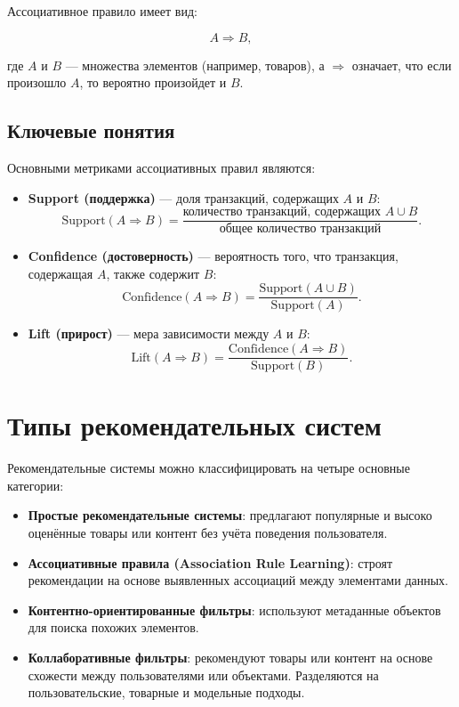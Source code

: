Ассоциативное правило имеет вид:

\begin{equation}
    A \Rightarrow B,
\end{equation}

где $A$ и $B$ — множества элементов (например, товаров), а $\Rightarrow$ означает, что если произошло $A$, то вероятно произойдет и $B$.

\subsection{Ключевые понятия}

Основными метриками ассоциативных правил являются:

\begin{itemize}
    \item \textbf{Support (поддержка)} — доля транзакций, содержащих $A$ и $B$:
          \[\text{Support}(A \Rightarrow B) = \frac{\text{количество транзакций, содержащих } A \cup B}{\text{общее количество транзакций}}.\]
    \item \textbf{Confidence (достоверность)} — вероятность того, что транзакция, содержащая $A$, также содержит $B$:
          \[\text{Confidence}(A \Rightarrow B) = \frac{\text{Support}(A \cup B)}{\text{Support}(A)}.\]
    \item \textbf{Lift (прирост)} — мера зависимости между $A$ и $B$:
          \[\text{Lift}(A \Rightarrow B) = \frac{\text{Confidence}(A \Rightarrow B)}{\text{Support}(B)}.\]
\end{itemize}

\section{Типы рекомендательных систем}

Рекомендательные системы можно классифицировать на четыре основные категории:

\begin{itemize}
    \item \textbf{Простые рекомендательные системы}: предлагают популярные и высоко оценённые товары или контент без учёта поведения пользователя.
    \item \textbf{Ассоциативные правила (Association Rule Learning)}: строят рекомендации на основе выявленных ассоциаций между элементами данных.
    \item \textbf{Контентно-ориентированные фильтры}: используют метаданные объектов для поиска похожих элементов.
    \item \textbf{Коллаборативные фильтры}: рекомендуют товары или контент на основе схожести между пользователями или объектами. Разделяются на пользовательские, товарные и модельные подходы.
\end{itemize}

